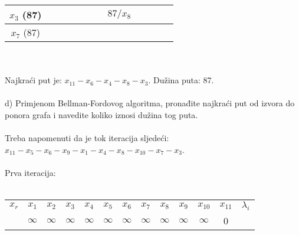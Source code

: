 \documentclass[12pt]{article}
\begin{document}
\begin{enumerate}
\begin{tabular}{|c|c|c|c|c|c|c|c|c|c|c|c|}
$x_3$ (87)    &                                   &                                   &                                   &                                   &                                    &                                    & {\color[HTML]{FE0000} $87/x_{8}$} &                                   &                                    &                                   &                          \\ \hline
$x_7$ (87)    &                                   &                                   &                                   &                                   &                                    &                                    &                                   &                                   &                                    &                                   &                          \\ \hline
\end{tabular}
\\
\\
Najkraći put je: $x_{11} - x_6 - x_4 - x_8 - x_3$. Dužina puta: 87.
\\
\\
d) Primjenom Bellman-Fordovog algoritma, pronađite najkraći put od izvora do ponora grafa i navedite koliko iznosi dužina tog puta.
\\
\\
Treba napomenuti da je tok iteracija sljedeći: $x_{11} - x_5 - x_6 - x_9 - x_1 - x_4 - x_{8} - x_{10} - x_7 - x_3$. \\
\\
Prva iteracija:
\\
\\
\begin{tabular}{|c|c|c|c|c|c|c|c|c|c|c|c|c|}
\hline
$x_r$    & $x_1$                           & $x_2$                           & $x_3$                           & $x_4$                           & $x_5$                           & $x_6$                           & $x_7$                           & $x_8$                           & $x_9$                           & $x_{10}$                        & $x_{11}$                 & $\lambda_i$                        \\ \cline{2-12}
         & {\color[HTML]{000000} $\infty$} & {\color[HTML]{000000} $\infty$} & {\color[HTML]{000000} $\infty$} & {\color[HTML]{000000} $\infty$} & {\color[HTML]{000000} $\infty$} & {\color[HTML]{000000} $\infty$} & {\color[HTML]{000000} $\infty$} & {\color[HTML]{000000} $\infty$} & {\color[HTML]{000000} $\infty$} & {\color[HTML]{000000} $\infty$} & {\color[HTML]{FE0000} 0} & {\color[HTML]{000000} }            \\ \hline

\end{tabular}
\end{enumerate}
\end{document}
